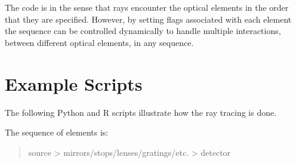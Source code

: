 \documentclass[letterpaper,10pt,english]{sphinxmanual}
\begin{document}
The code is  in the sense
that rays encounter the optical elements in the order that they are specified.
However, by setting flags associated
with each element the sequence can be controlled dynamically to handle
multiple interactions, between different optical elements, in any sequence.


\section{Example Scripts}
\label{\detokenize{xsrt_example_scripts:example-scripts}}\label{\detokenize{xsrt_example_scripts::doc}}
The following Python and R scripts illustrate how the ray tracing is done.

The sequence of elements is:
\begin{quote}

source \textendash{}\textgreater{} mirrors/stops/lenses/gratings/etc. \textendash{}\textgreater{} detector
\end{quote}
\end{document}
